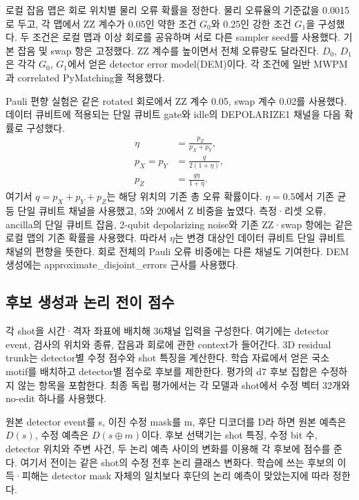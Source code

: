 \documentclass[aps,prd,12pt,twocolumn,superscriptaddress,floatfix]{revtex4-2}
\begin{document}
로컬 잡음 맵은 회로 위치별 물리 오류 확률을 정한다. 물리 오류율의 기준값을 0.0015로 두고, 각 맵에서 ZZ 계수가 0.05인 약한 조건 \(G_0\)와 0.25인 강한 조건 \(G_1\)을 구성했다. 두 조건은 로컬 맵과 이상 회로를 공유하며 서로 다른 sampler seed를 사용했다. 기본 잡음 및 swap 항은 고정했다. ZZ 계수를 높이면서 전체 오류량도 달라진다. \(D_0\), \(D_1\)은 각각 \(G_0\), \(G_1\)에서 얻은 detector error model(DEM)이다. 각 조건에 일반 MWPM과 correlated PyMatching을 적용했다.

Pauli 편향 실험은 같은 rotated 회로에서 ZZ 계수 0.05, swap 계수 0.02를 사용했다. 데이터 큐비트에 적용되는 단일 큐비트 gate와 idle의 DEPOLARIZE1 채널을 다음 확률로 구성했다.
\begin{equation}
\begin{aligned}
\eta&=\frac{p_Z}{p_X+p_Y},\\
p_X=p_Y&=\frac{q}{2(1+\eta)},\\
p_Z&=\frac{q\eta}{1+\eta}.
\end{aligned}
\label{eq:data-pauli-bias}
\end{equation}
여기서 \(q=p_X+p_Y+p_Z\)는 해당 위치의 기존 총 오류 확률이다. \(\eta=0.5\)에서 기존 균등 단일 큐비트 채널을 사용했고, 5와 20에서 Z 비중을 높였다. 측정·리셋 오류, ancilla의 단일 큐비트 잡음, 2-qubit depolarizing noise와 기존 ZZ·swap 항에는 같은 로컬 맵의 기존 확률을 사용했다. 따라서 \(\eta\)는 변경 대상인 데이터 큐비트 단일 큐비트 채널의 편향을 뜻한다. 회로 전체의 Pauli 오류 비중에는 다른 채널도 기여한다. DEM 생성에는 approximate\_disjoint\_errors 근사를 사용했다.

\subsection{후보 생성과 논리 전이 점수}

각 shot을 시간·격자 좌표에 배치해 36채널 입력을 구성한다. 여기에는 detector event, 검사의 위치와 종류, 잡음과 회로에 관한 context가 들어간다. 3D residual trunk는 detector별 수정 점수와 shot 특징을 계산한다. 학습 자료에서 얻은 국소 motif를 배치하고 detector별 점수로 후보를 제한한다. 평가의 d7 후보 집합은 수정하지 않는 항목을 포함한다. 최종 독립 평가에서는 각 모델과 shot에서 수정 벡터 32개와 no-edit 하나를 사용했다.

원본 detector event를 s, 이진 수정 mask를 m, 후단 디코더를 D라 하면 원본 예측은 \(D(s)\), 수정 예측은 \(D(s \oplus m)\)이다. 후보 선택기는 shot 특징, 수정 bit 수, detector 위치와 주변 사건, 두 논리 예측 사이의 변화를 이용해 각 후보에 점수를 준다. 여기서 전이는 같은 shot의 수정 전후 논리 클래스 변화다. 학습에 쓰는 후보의 이득·피해는 detector mask 자체의 일치보다 후단의 논리 예측이 맞았는지에 따라 정한다.
\end{document}
